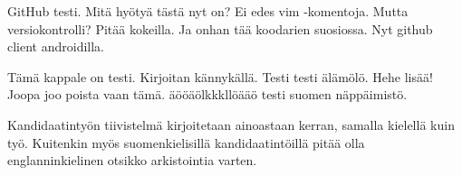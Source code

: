 \documentclass[12pt,a4paper,finnish]{tutthesis}
\begin{document}
GitHub testi. Mitä hyötyä tästä nyt on? Ei edes vim -komentoja.
Mutta versiokontrolli? Pitää kokeilla. Ja onhan tää koodarien
suosiossa. Nyt github client androidilla.

Tämä kappale on testi. Kirjoitan kännykällä.
Testi testi älämölö. Hehe lisää!
Joopa joo poista vaan tämä.
äööäölkkkllöääö testi suomen näppäimistö.
 
Kandidaatintyön tiivistelmä kirjoitetaan ainoastaan kerran, samalla
kielellä kuin työ. Kuitenkin myös suomenkielisillä kandidaatintöillä
pitää olla englanninkielinen otsikko arkistointia varten.



%
%
%
%

\end{document}
